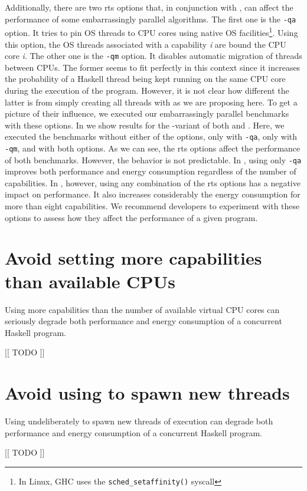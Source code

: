 Additionally, there are two \ac{rts} options that, in conjunction with \forkOn, can affect the performance of some embarrassingly parallel algorithms. The first one is the \texttt{-qa} option. It tries to pin OS threads to CPU cores using native OS facilities\footnote{In Linux, GHC uses the \texttt{sched\_setaffinity()} syscall}. Using this option, the OS threads associated with a capability \emph{i} are bound the CPU core \emph{i}. The other one is the \texttt{-qm} option. It disables automatic migration of threads between CPUs. The former seems to fit perfectly in this context since it increases the probability of a Haskell thread being kept running on the same CPU core during the execution of the program. However, it is not clear how different the latter is from simply creating all threads with \forkOn as we are proposing here. To get a picture of their influence, we executed our embarrassingly parallel benchmarks with these options. In  we show results for the \forkOn-\MVar variant of both \regex and \spectral. Here, we executed the benchmarks without either of the options, only with \texttt{-qa}, only with \texttt{-qm}, and with both options. As we can see, the \ac{rts} options affect the performance of both benchmarks. However, the behavior is not predictable. In \spectral, using only \texttt{-qa} improves both performance and energy consumption regardless of the number of capabilities. In \regex, however, using any combination of the \ac{rts} options has a negative impact on performance. It also increases considerably the energy consumption for more than eight capabilities. We recommend developers to experiment with these options to assess how they affect the performance of a given program.


\section{Avoid setting more capabilities than available CPUs} %
 Using more capabilities than the number of available virtual CPU cores can seriously degrade both performance and energy consumption of a concurrent Haskell program.
\newline

 [[ TODO ]]



\section{Avoid using \forkOS to spawn new threads}
 Using \forkOS undeliberately to spawn new threads of execution can degrade both performance and energy consumption of a concurrent Haskell program.
\newline

 [[ TODO ]]

